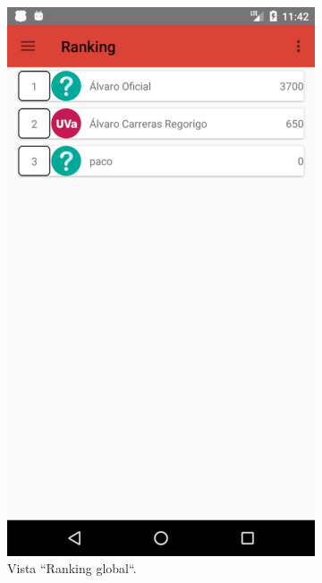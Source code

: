 \documentclass[twoside]{report}
\begin{document}
\begin{figure}[H]
\begin{center}
\begin{subfigure}[t]{.3\linewidth}
		\includegraphics[scale=0.2]{images/userguide/12.png}
		\caption{Vista “Ranking global“.}
	\end{subfigure}\hspace{2mm}%
	\begin{subfigure}[t]{.3\linewidth}

\end{subfigure}
\end{center}
\end{figure}
\end{document}
